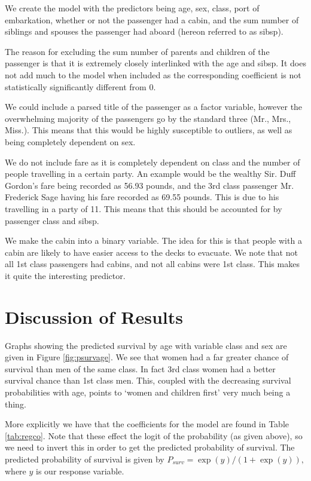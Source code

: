 \documentclass[]{extarticle}
\begin{document}
We create the model with the predictors being age, sex, class, port of embarkation, whether or not the passenger had a cabin, and the sum number of siblings and spouses the passenger had aboard (hereon referred to as sibsp).

The reason for excluding the sum number of parents and children of the passenger is that it is extremely closely interlinked with the age and sibsp. It does not add much to the model when included as the corresponding coefficient is not statistically significantly different from 0.

We could include a parsed title of the passenger as a factor variable, however the overwhelming majority of the passengers go by the standard three (Mr., Mrs., Miss.). This means that this would be highly susceptible to outliers, as well as being completely dependent on sex.

We do not include fare as it is completely dependent on class and the number of people travelling in a certain party. An example would be the wealthy Sir. Duff Gordon's fare being recorded as 56.93 pounds, and the 3rd class passenger Mr. Frederick Sage having his fare recorded as 69.55 pounds. This is due to his travelling in a party of 11. This means that this should be accounted for by passenger class and sibsp.

We make the cabin into a binary variable. The idea for this is that people with a cabin are likely to have easier access to the decks to evacuate. We note that not all 1st class passengers had cabins, and not all cabins were 1st class. This makes it quite the interesting predictor.

\section{Discussion of Results}

Graphs showing the predicted survival by age with variable class and sex are given in Figure \ref{fig:psurvage}. We see that women had a far greater chance of survival than men of the same class. In fact 3rd class women had a better survival chance than 1st class men. This, coupled with the decreasing survival probabilities with age, points to `women and children first' very much being a thing. 

More explicitly we have that the coefficients for the model are found in Table \ref{tab:regco}. Note that these effect the logit of the probability (as given above), so we need to invert this in order to get the predicted probability of survival. The predicted probability of survival is given by $P_{surv} = \exp(y)/(1+\exp(y)),$ where $y$ is our response variable.
\end{document}
